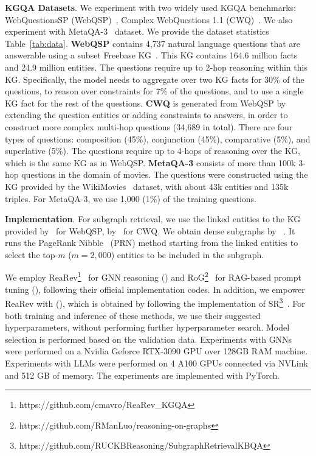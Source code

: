 \textbf{KGQA Datasets}.
We experiment with two widely used KGQA benchmarks: WebQuestionsSP (WebQSP)~\cite{yih2015semantic}, 
Complex WebQuestions 1.1 (CWQ)~\cite{talmor2018web}.
We also experiment with MetaQA-3~\cite{zhang2018variational} dataset.
We provide the  dataset statistics Table~\ref{tab:data}.
\textbf{WebQSP} contains 4,737 natural language questions that are answerable using a subset Freebase KG~\citep{bollacker2008freebase}. This  KG contains 164.6 million facts and 24.9 million entities. The questions require up to 2-hop reasoning within this KG. Specifically, the model needs to aggregate over two KG facts for 30\% of the questions, to reason over constraints for 7\% of the questions, and to use a single KG fact for the rest of the questions.
\noindent
\textbf{CWQ} is generated from WebQSP by extending the question entities or
adding constraints to answers, in order to construct  more complex multi-hop questions (34,689 in total). There are
four types of questions: composition (45\%), conjunction (45\%), comparative (5\%), and superlative
(5\%). The questions require up to 4-hops of reasoning over the KG, which is the same KG as in WebQSP. \textbf{MetaQA-3} consists of more than 100k 3-hop questions in the domain of movies. The questions were constructed using the KG provided by the WikiMovies~\cite{miller2016key} dataset, with about 43k entities and 135k triples. For MetaQA-3, we use 1,000 (1\%) of the training questions.





\textbf{Implementation}. 
For subgraph retrieval, we use the linked entities to the KG provided by~\cite{yih2015semantic} for WebQSP, by~\cite{talmor2018web} for CWQ. We obtain dense subgraphs by ~\cite{he2021improving}. It runs the PageRank Nibble~\cite{andersen2006local} (PRN) method starting from the linked entities to select the top-$m$ ($m=2,000$) entities to be included in the subgraph.

We employ ReaRev\footnote{https://github.com/cmavro/ReaRev\_KGQA}~\citep{mavromatis2022rearev} for GNN reasoning () and RoG\footnote{https://github.com/RManLuo/reasoning-on-graphs}~\citep{luo2024rog} for RAG-based prompt tuning (), following their official implementation codes. 
In addition, we empower ReaRev with \lmsr (), which is obtained by following the implementation of SR\footnote{https://github.com/RUCKBReasoning/SubgraphRetrievalKBQA}~\citep{zhang2022subgraph}. For both training and inference of these methods, we use their suggested hyperparameters, without performing further hyperparameter search. Model selection is performed based on the validation data. Experiments with GNNs were performed on a  Nvidia Geforce
RTX-3090 GPU over 128GB RAM
machine. Experiments with LLMs were performed on 4 A100 GPUs connected via NVLink and 512 GB of memory. The experiments are implemented with PyTorch. 

